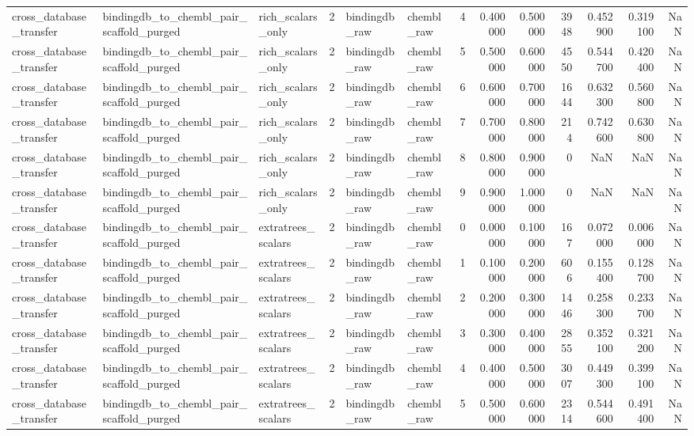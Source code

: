 \begin{longtable}{lllrllrrrrrrr}
cross\_database\_transfer & bindingdb\_to\_chembl\_pair\_scaffold\_purged & rich\_scalars\_only & 2 & bindingdb\_raw & chembl\_raw & 4 & 0.400000 & 0.500000 & 3948 & 0.452900 & 0.319100 & NaN \\
cross\_database\_transfer & bindingdb\_to\_chembl\_pair\_scaffold\_purged & rich\_scalars\_only & 2 & bindingdb\_raw & chembl\_raw & 5 & 0.500000 & 0.600000 & 4550 & 0.544700 & 0.420400 & NaN \\
cross\_database\_transfer & bindingdb\_to\_chembl\_pair\_scaffold\_purged & rich\_scalars\_only & 2 & bindingdb\_raw & chembl\_raw & 6 & 0.600000 & 0.700000 & 1644 & 0.632300 & 0.560800 & NaN \\
cross\_database\_transfer & bindingdb\_to\_chembl\_pair\_scaffold\_purged & rich\_scalars\_only & 2 & bindingdb\_raw & chembl\_raw & 7 & 0.700000 & 0.800000 & 214 & 0.742600 & 0.630800 & NaN \\
cross\_database\_transfer & bindingdb\_to\_chembl\_pair\_scaffold\_purged & rich\_scalars\_only & 2 & bindingdb\_raw & chembl\_raw & 8 & 0.800000 & 0.900000 & 0 & NaN & NaN & NaN \\
cross\_database\_transfer & bindingdb\_to\_chembl\_pair\_scaffold\_purged & rich\_scalars\_only & 2 & bindingdb\_raw & chembl\_raw & 9 & 0.900000 & 1.000000 & 0 & NaN & NaN & NaN \\
cross\_database\_transfer & bindingdb\_to\_chembl\_pair\_scaffold\_purged & extratrees\_scalars & 2 & bindingdb\_raw & chembl\_raw & 0 & 0.000000 & 0.100000 & 167 & 0.072000 & 0.006000 & NaN \\
cross\_database\_transfer & bindingdb\_to\_chembl\_pair\_scaffold\_purged & extratrees\_scalars & 2 & bindingdb\_raw & chembl\_raw & 1 & 0.100000 & 0.200000 & 606 & 0.155400 & 0.128700 & NaN \\
cross\_database\_transfer & bindingdb\_to\_chembl\_pair\_scaffold\_purged & extratrees\_scalars & 2 & bindingdb\_raw & chembl\_raw & 2 & 0.200000 & 0.300000 & 1446 & 0.258300 & 0.233700 & NaN \\
cross\_database\_transfer & bindingdb\_to\_chembl\_pair\_scaffold\_purged & extratrees\_scalars & 2 & bindingdb\_raw & chembl\_raw & 3 & 0.300000 & 0.400000 & 2855 & 0.352100 & 0.321200 & NaN \\
cross\_database\_transfer & bindingdb\_to\_chembl\_pair\_scaffold\_purged & extratrees\_scalars & 2 & bindingdb\_raw & chembl\_raw & 4 & 0.400000 & 0.500000 & 3007 & 0.449300 & 0.399100 & NaN \\
cross\_database\_transfer & bindingdb\_to\_chembl\_pair\_scaffold\_purged & extratrees\_scalars & 2 & bindingdb\_raw & chembl\_raw & 5 & 0.500000 & 0.600000 & 2314 & 0.544600 & 0.491400 & NaN \\

\end{longtable}
